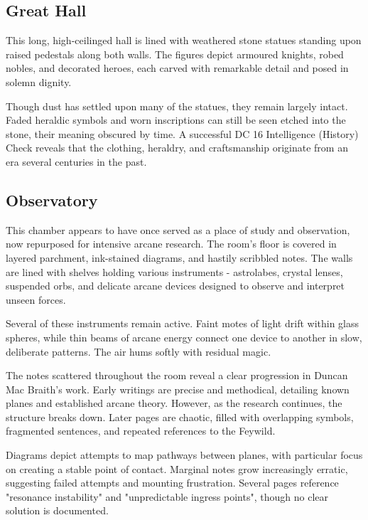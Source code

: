 \subsection*{ Great Hall}
{\entryfont This long, high-ceilinged hall is lined with weathered stone statues standing upon raised pedestals along both walls. The figures depict armoured knights, robed nobles, and decorated heroes, each carved with remarkable detail and posed in solemn dignity.

Though dust has settled upon many of the statues, they remain largely intact. Faded heraldic symbols and worn inscriptions can still be seen etched into the stone, their meaning obscured by time.  A successful DC 16 Intelligence (History) Check reveals that the clothing, heraldry, and craftsmanship originate from an era several centuries in the past.}
\subsection*{ Observatory}
{\entryfont This chamber appears to have once served as a place of study and observation, now repurposed for intensive arcane research. The room's floor is covered in layered parchment, ink-stained diagrams, and hastily scribbled notes. The walls are lined with shelves holding various instruments - astrolabes, crystal lenses, suspended orbs, and delicate arcane devices designed to observe and interpret unseen forces.

Several of these instruments remain active. Faint motes of light drift within glass spheres, while thin beams of arcane energy connect one device to another in slow, deliberate patterns. The air hums softly with residual magic.

The notes scattered throughout the room reveal a clear progression in Duncan Mac Braith's work. Early writings are precise and methodical, detailing known planes and established arcane theory. However, as the research continues, the structure breaks down. Later pages are chaotic, filled with overlapping symbols, fragmented sentences, and repeated references to the Feywild.

Diagrams depict attempts to map pathways between planes, with particular focus on creating a stable point of contact. Marginal notes grow increasingly erratic, suggesting failed attempts and mounting frustration. Several pages reference "resonance instability" and "unpredictable ingress points", though no clear solution is documented.}
